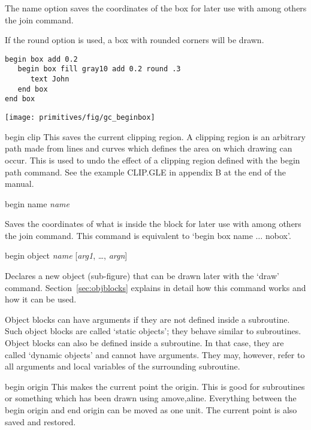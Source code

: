 \begin{commanddescription}
The {\sf name} option saves the coordinates of the box for later use
with among others the {\sf join} command.

If the {\sf round} option is used, a box with rounded corners will be drawn.

\begin{minipage}[c]{8cm}
\begin{Verbatim}
begin box add 0.2
   begin box fill gray10 add 0.2 round .3
      text John
   end box
end box
\end{Verbatim}
\end{minipage}
\hfill
\begin{minipage}[c]{7cm}
\mbox{\texttt{[image: primitives/fig/gc\_beginbox]}}
\end{minipage}

\item[{\sf begin clip }]
This saves the current clipping region.
A clipping region is an arbitrary path made from lines and curves
which defines the area on which drawing can occur.
This is used to undo the
effect of a clipping region defined with the begin path command.
See the example CLIP.GLE in appendix B at the end of the manual.

\item[{\sf begin name {\it name}}]
\label{cmd:beginname}

Saves the coordinates of what is inside the block for later use with among others the {\sf join} command. This command is equivalent to `{\sf begin box name} $\ldots$ {\sf nobox}'.

\item[{\sf begin object {\it name} [{\it arg1}, \ldots, {\it argn}]}]
\label{cmd:beginobject}

Declares a new object (sub-figure) that can be drawn later with the `{\sf draw}' command. Section~\ref{sec:objblocks} explains in detail how this command works and how it can be used.

Object blocks can have arguments if they are not defined inside a subroutine. Such object blocks are called `static objects'; they behave similar to subroutines. Object blocks can also be defined inside a subroutine. In that case, they are called `dynamic objects' and cannot have arguments. They may, however, refer to all arguments and local variables of the surrounding subroutine.

\item[{\sf begin origin}]
 This makes the current point the origin.
This is good for subroutines or something which has been drawn
using {\sf amove,aline}. Everything between the {\sf begin origin} and
{\sf end origin} can be moved as one unit.  The current point is also
saved and restored.


\end{commanddescription}
